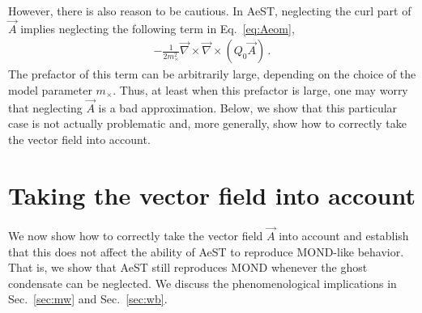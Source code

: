 \documentclass[reprint, amsmath,amssymb, nofootinbib, aps, prd]{revtex4-2}
\begin{document}
However, there is also reason to be cautious.
In AeST, neglecting the curl part of $\vec{A}$ implies neglecting the following term in Eq.~\eqref{eq:Aeom},
\begin{align}
 - \frac{1}{2 m_\times^2} \vec{\nabla} \times \vec{\nabla} \times (Q_0 \vec{A}) \,.
\end{align}
The prefactor of this term can be arbitrarily large, depending on the choice of the model parameter $m_\times$.
Thus, at least when this prefactor is large, one may worry that neglecting $\vec{A}$ is a bad approximation.
Below, we show that this particular case is not actually problematic and, more generally, show how to correctly take the vector field into account.

\section{Taking the vector field into account}
\label{sec:vector}

We now show how to correctly take the vector field $\vec{A}$ into account and establish that this does not affect the ability of AeST to reproduce MOND-like behavior.
That is, we show that AeST still reproduces MOND whenever the ghost condensate can be neglected.
We discuss the phenomenological implications in Sec.~\ref{sec:mw} and Sec.~\ref{sec:wb}.
\end{document}
